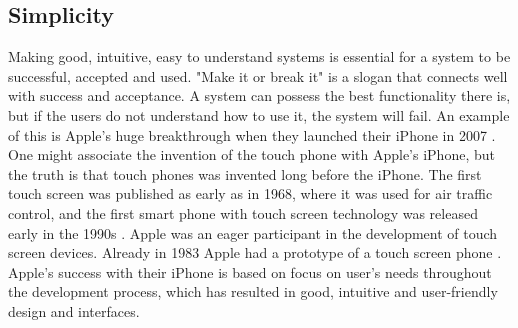 \subsection{Simplicity}
\label{sec:simplicity}
Making good, intuitive, easy to understand systems is essential for a system to be successful, accepted and used. "Make it or break it" is a slogan that connects well with success and acceptance. A system can possess the best functionality there is, but if the users do not understand how to use it, the system will fail. An example of this is Apple's huge breakthrough when they launched their iPhone in 2007 \cite{iphone2007}. One might associate the invention of the touch phone with Apple's iPhone, but the truth is that touch phones was invented long before the iPhone. The first touch screen was published as early as in 1968, where it was used for air traffic control, and the first smart phone with touch screen technology was released early in the 1990s \cite{touchphone}. Apple was an eager participant in the development of touch screen devices. Already in 1983 Apple had a prototype of a touch screen phone \cite{applefirst1983}. Apple's success with their iPhone is based on focus on user's needs throughout the development process, which has resulted in good, intuitive and user-friendly design and interfaces. 

